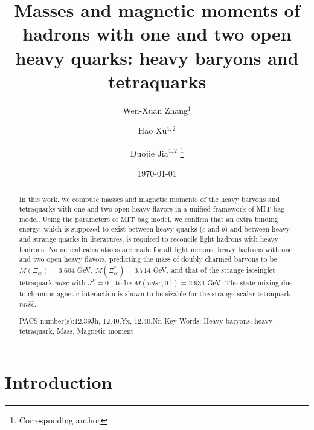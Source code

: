 \documentclass[12pt,prd,onecolumn,floatfix,nofootinbib]{revtex4}
\begin{document}
\title{Masses and magnetic moments of hadrons with one and two open heavy
quarks: heavy baryons and tetraquarks}
\author{Wen-Xuan Zhang$^{1}$}
\author{Hao Xu$^{1,2}$}
\author{Duojie Jia$^{1,2}$ \thanks{%
Corresponding author}}

\begin{abstract}
In this work, we compute masses and magnetic moments of the heavy baryons
and tetraquarks with one and two open heavy flavors in a unified framework
of MIT bag model. Using the parameters of MIT bag model, we confirm that an
extra binding energy, which is supposed to exist between heavy quarks ($c$
and $b$) and between heavy and strange quarks in literatures, is
required to reconcile light hadrons with heavy hadrons. Numerical
calculations are made for all light mesons, heavy hadrons with one and two
open heavy flavors, predicting the mass of doubly charmed baryons to be $%
M(\Xi _{cc})=3.604$ GeV, $M(\Xi _{cc}^{\ast })=3.714$ GeV, and that of the
strange isosinglet tetraquark $ud\bar{s}\bar{c}$ with $J^{P}=0^{+}$ to be $%
M\left( ud\bar{s}\bar{c},0^{+}\right) =2.934$ GeV. The state mixing due to
chromomagnetic interaction is shown to be sizable for the strange scalar
tetraquark $nn\bar{s}\bar{c}$.

{\normalsize PACS number(s):12.39Jh, 12.40.Yx, 12.40.Nn} {\normalsize Key
Words: Heavy baryons, heavy tetraquark, Mass, Magnetic moment}
\end{abstract}

\maketitle
\date{\today }


\section{Introduction}
\end{document}
